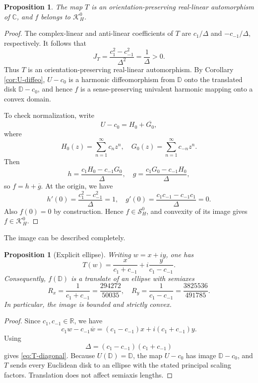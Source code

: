 \documentclass[11pt,reqno]{amsart}
\numberwithin{equation}{section}
\newtheorem{proposition}[theorem]{Proposition}
\theoremstyle{definition}
\theoremstyle{remark}
\newcommand{\D}{\mathbb D}
\newcommand{\C}{\mathbb C}
\newcommand{\R}{\mathbb R}
\newcommand{\KHZ}{\mathcal K_H^0}
\newcommand{\SHZ}{\mathcal S_H^0}
\newcommand{\Jac}{J}
\begin{document}
\begin{proposition}\label{prop:normalization}
The map $T$ is an orientation-preserving real-linear automorphism of $\C$, and $f$ belongs to $\KHZ$.
\end{proposition}

\begin{proof}
The complex-linear and anti-linear coefficients of $T$ are $c_1/\Delta$ and $-c_{-1}/\Delta$, respectively.  It follows that
\[
 \Jac_T
 =\frac{c_1^2-c_{-1}^2}{\Delta^2}
 =\frac1\Delta>0.
\]
Thus $T$ is an orientation-preserving real-linear automorphism.  By Corollary \ref{cor:U-diffeo}, $U-c_0$ is a harmonic diffeomorphism from $\D$ onto the translated disk $\D-c_0$, and hence $f$ is a sense-preserving univalent harmonic mapping onto a convex domain.

To check normalization, write
\[
 U-c_0=H_0+\overline{G_0},
\]
where
\[
 H_0(z)=\sum_{n=1}^{\infty}c_nz^n,
 \quad
 G_0(z)=\sum_{n=1}^{\infty}c_{-n}z^n.
\]
Then
\begin{equation}\label{eq:hg-formulas}
 h=\frac{c_1H_0-c_{-1}G_0}{\Delta},
 \quad
 g=\frac{c_1G_0-c_{-1}H_0}{\Delta},
\end{equation}
so $f=h+\overline g$.  At the origin, we have
\[
 h'(0)=\frac{c_1^2-c_{-1}^2}{\Delta}=1,
 \quad
 g'(0)=\frac{c_1c_{-1}-c_{-1}c_1}{\Delta}=0.
\]
Also $f(0)=0$ by construction.  Hence $f\in\SHZ$, and convexity of its image gives $f\in\KHZ$.
\end{proof}

The image can be described completely.

\begin{proposition}[Explicit ellipse]\label{prop:ellipse}
Writing $w=x+iy$, one has
\begin{equation}\label{eq:T-diagonal}
 T(w)=\frac{x}{c_1+c_{-1}}
 +i\frac{y}{c_1-c_{-1}}.
\end{equation}
Consequently, $f(\D)$ is a translate of an ellipse with semiaxes
\begin{equation}\label{eq:axes}
 R_x=\frac1{c_1+c_{-1}}
 =\frac{294272}{50035},
 \quad
 R_y=\frac1{c_1-c_{-1}}
 =\frac{3825536}{491785}.
\end{equation}
In particular, the image is bounded and strictly convex.
\end{proposition}

\begin{proof}
Since $c_1,c_{-1}\in\R$, we have
\[
 c_1w-c_{-1}\overline w
 =(c_1-c_{-1})x+i(c_1+c_{-1})y.
\]
Using
\[
 \Delta=(c_1-c_{-1})(c_1+c_{-1})
\]
gives \eqref{eq:T-diagonal}.  Because $U(\D)=\D$, the map $U-c_0$ has image $\D-c_0$, and $T$ sends every Euclidean disk to an ellipse with the stated principal scaling factors.  Translation does not affect semiaxis lengths.
\end{proof}
\end{document}
